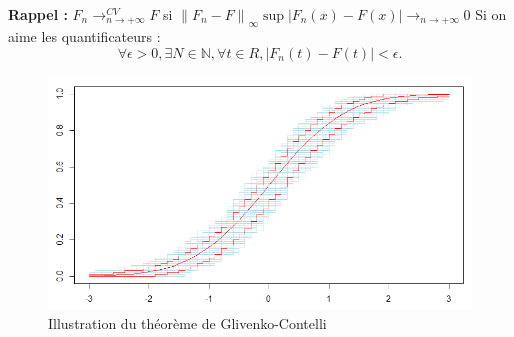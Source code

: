 \documentclass{article}
\theoremstyle{plain}%
\theoremstyle{definition}
\theoremstyle{remark}
\begin{document}
\textbf{Rappel : } $ F_n \to ^{CV}_{n \to + \infty } F $ si $ \left\| F_n -F \right\| _{\infty} \sup \left| F_n(x) - F(x)\right| \to_{n \to + \infty } 0$  Si on aime les quantificateurs : 
\[
    \forall \epsilon > 0, \exists N \in \mathbb{N}, \forall t \in R, \left| F_n(t) - F(t) \right| < \epsilon 
.\]

\begin{figure}[htbp]
    \centering
    \includegraphics[width=\textwidth]{figures/figure2.png}
    \caption{Illustration du théorème de Glivenko-Contelli}
\end{figure}
\end{document}
